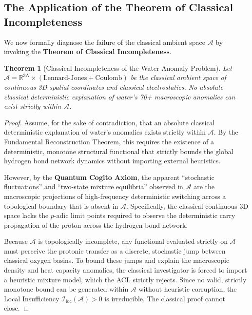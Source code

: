 \documentclass[11pt,openany]{extbook}
\theoremstyle{plain}
\newtheorem{theorem}{Theorem}[chapter]
\theoremstyle{definition}
\begin{document}
\subsection{The Application of the Theorem of Classical Incompleteness}
We now formally diagnose the failure of the classical ambient space $\mathcal{A}$ by invoking the \textbf{Theorem of Classical Incompleteness}.

\begin{theorem}[Classical Incompleteness of the Water Anomaly Problem]
Let $\mathcal{A} = \mathbb{R}^{3N} \times (\text{Lennard-Jones} + \text{Coulomb})$ be the classical ambient space of continuous 3D spatial coordinates and classical electrostatics. No absolute classical deterministic explanation of water's 70+ macroscopic anomalies can exist strictly within $\mathcal{A}$.
\end{theorem}

\begin{proof}
Assume, for the sake of contradiction, that an absolute classical deterministic explanation of water's anomalies exists strictly within $\mathcal{A}$. By the Fundamental Reconstruction Theorem, this requires the existence of a deterministic, monotone structural functional that strictly bounds the global hydrogen bond network dynamics without importing external heuristics.

However, by the \textbf{Quantum Cogito Axiom}, the apparent ``stochastic fluctuations'' and ``two-state mixture equilibria'' observed in $\mathcal{A}$ are the macroscopic projections of high-frequency deterministic switching across a topological boundary that is absent in $\mathcal{A}$. Specifically, the classical continuous 3D space lacks the $p$-adic limit points required to observe the deterministic carry propagation of the proton across the hydrogen bond network.

Because $\mathcal{A}$ is topologically incomplete, any functional evaluated strictly on $\mathcal{A}$ must perceive the protonic transfer as a discrete, stochastic jump between classical oxygen basins. To bound these jumps and explain the macroscopic density and heat capacity anomalies, the classical investigator is forced to import a heuristic mixture model, which the ACL strictly rejects. Since no valid, strictly monotone bound can be generated within $\mathcal{A}$ without heuristic corruption, the Local Insufficiency $\mathcal{I}_{\mathrm{loc}}(\mathcal{A}) > 0$ is irreducible. The classical proof cannot close.
\end{proof}
\end{document}
